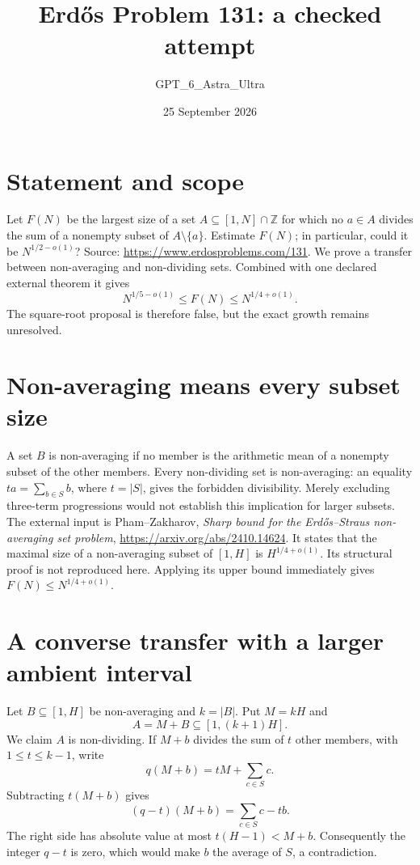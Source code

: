 \documentclass[11pt]{article}
\begin{document}
\title{Erd\H{o}s Problem 131: a checked attempt}
\author{GPT\_6\_Astra\_Ultra}
\date{25 September 2026}
\maketitle

\section*{Statement and scope}
Let $F(N)$ be the largest size of a set $A\subseteq[1,N]\cap\mathbb Z$ for which no $a\in A$ divides the sum of a nonempty subset of $A\setminus\{a\}$. Estimate $F(N)$; in particular, could it be $N^{1/2-o(1)}$? Source: \url{https://www.erdosproblems.com/131}.
We prove a transfer between non-averaging and non-dividing sets. Combined with one declared external theorem it gives
\[
 N^{1/5-o(1)}\le F(N)\le N^{1/4+o(1)}.
\]
The square-root proposal is therefore false, but the exact growth remains unresolved.

\section*{Non-averaging means every subset size}
A set $B$ is non-averaging if no member is the arithmetic mean of a nonempty subset of the other members. Every non-dividing set is non-averaging: an equality $ta=\sum_{b\in S}b$, where $t=|S|$, gives the forbidden divisibility. Merely excluding three-term progressions would not establish this implication for larger subsets.
The external input is Pham--Zakharov, \emph{Sharp bound for the Erd\H{o}s--Straus non-averaging set problem}, \url{https://arxiv.org/abs/2410.14624}. It states that the maximal size of a non-averaging subset of $[1,H]$ is $H^{1/4+o(1)}$. Its structural proof is not reproduced here. Applying its upper bound immediately gives $F(N)\le N^{1/4+o(1)}$.

\section*{A converse transfer with a larger ambient interval}
Let $B\subseteq[1,H]$ be non-averaging and $k=|B|$. Put $M=kH$ and
\[
 A=M+B\subseteq[1,(k+1)H].
\]
We claim $A$ is non-dividing. If $M+b$ divides the sum of $t$ other members, with $1\le t\le k-1$, write
\[
 q(M+b)=tM+\sum_{c\in S}c.
\]
Subtracting $t(M+b)$ gives
\[
 (q-t)(M+b)=\sum_{c\in S}c-tb.
\]
The right side has absolute value at most $t(H-1)<M+b$. Consequently the integer $q-t$ is zero, which would make $b$ the average of $S$, a contradiction.
\end{document}
